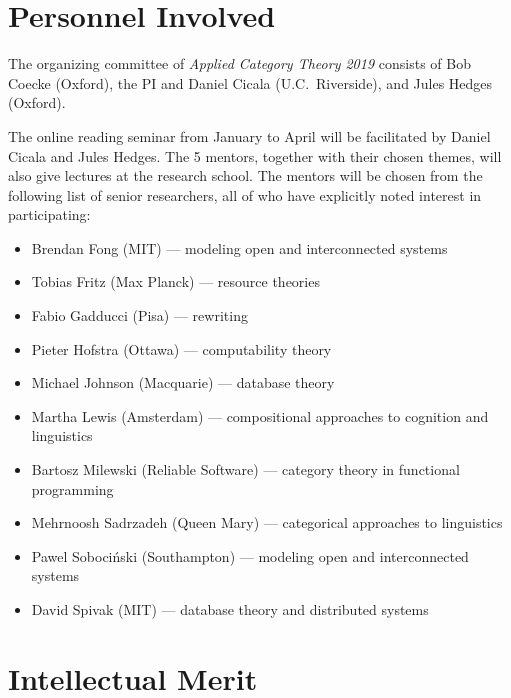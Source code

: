\documentclass[12pt]{amsart}
\begin{document}

\section{Personnel Involved}

The organizing committee of \textsl{Applied Category Theory
  2019} consists of Bob Coecke (Oxford), the PI and Daniel
Cicala (U.C.\ Riverside), and Jules Hedges (Oxford).

The online reading seminar from January to April will be
facilitated by Daniel Cicala and Jules Hedges.  The 5
mentors, together with their chosen themes, will also give
lectures at the research school. The mentors will be chosen
from the following list of senior researchers, all of who
have explicitly noted interest in participating:

\begin{itemize}
\item Brendan Fong (MIT) --- modeling open and
  interconnected systems
\item
  Tobias Fritz (Max Planck) --- resource theories
\item
  Fabio Gadducci (Pisa) --- rewriting
\item
  Pieter Hofstra (Ottawa) --- computability theory
\item
  Michael Johnson (Macquarie) --- database theory
\item 
  Martha Lewis (Amsterdam) --- compositional approaches to cognition and linguistics
\item
  Bartosz Milewski (Reliable Software) --- category theory in functional programming
\item
  Mehrnoosh Sadrzadeh (Queen Mary) --- categorical approaches to linguistics
\item
  Pawel Soboci\'nski (Southampton) --- modeling open and
  interconnected systems
\item
  David Spivak (MIT) --- database theory and distributed
  systems
\end{itemize}


\section{Intellectual Merit}
\end{document}
